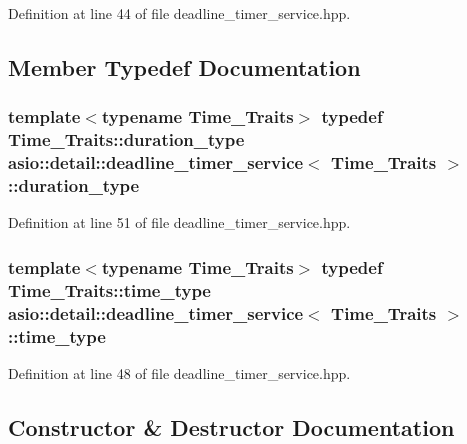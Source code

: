 Definition at line 44 of file deadline\+\_\+timer\+\_\+service.\+hpp.



\subsection{Member Typedef Documentation}
\hypertarget{classasio_1_1detail_1_1deadline__timer__service_aa2f42592b15216b94578b059efa9b304}{}
\subsubsection[{duration\+\_\+type}]{\setlength{\rightskip}{0pt plus 5cm}template$<$typename Time\+\_\+\+Traits$>$ typedef Time\+\_\+\+Traits\+::duration\+\_\+type {\bf asio\+::detail\+::deadline\+\_\+timer\+\_\+service}$<$ Time\+\_\+\+Traits $>$\+::{\bf duration\+\_\+type}}\label{classasio_1_1detail_1_1deadline__timer__service_aa2f42592b15216b94578b059efa9b304}


Definition at line 51 of file deadline\+\_\+timer\+\_\+service.\+hpp.

\hypertarget{classasio_1_1detail_1_1deadline__timer__service_a217817497abe6136c056c0facdd3f8aa}{}
\subsubsection[{time\+\_\+type}]{\setlength{\rightskip}{0pt plus 5cm}template$<$typename Time\+\_\+\+Traits$>$ typedef Time\+\_\+\+Traits\+::time\+\_\+type {\bf asio\+::detail\+::deadline\+\_\+timer\+\_\+service}$<$ Time\+\_\+\+Traits $>$\+::{\bf time\+\_\+type}}\label{classasio_1_1detail_1_1deadline__timer__service_a217817497abe6136c056c0facdd3f8aa}


Definition at line 48 of file deadline\+\_\+timer\+\_\+service.\+hpp.



\subsection{Constructor \& Destructor Documentation}
\hypertarget{classasio_1_1detail_1_1deadline__timer__service_a9d778b855ccb8db82f300ed107929322}{}
